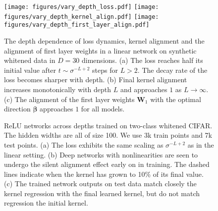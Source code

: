 \documentclass{article} %
\begin{document}
\begin{appendix}

\begin{figure}[ht]
    \centering
    \texttt{[image: figures/vary\_depth\_loss.pdf]}
    \texttt{[image: figures/vary\_depth\_kernel\_align.pdf]}
    \texttt{[image: figures/vary\_depth\_first\_layer\_align.pdf]}
    \caption{The depth dependence of loss dynamics, kernel alignment and the alignment of first layer weights in a linear network on synthetic whitened data in $D=30$ dimensions. (a) The loss reaches half its initial value after $t \sim \sigma^{-L + 2}$ steps for $L>2$. The decay rate of the loss becomes sharper with depth. (b) Final kernel alignment increases monotonically with depth $L$ and approaches $1$ as $L \to \infty$. (c) The alignment of the first layer weights $\bm W_1$ with the optimal direction $\bm\beta$ approaches $1$ for all models.  }
    \label{fig:my_label}
\end{figure}


\begin{figure}[ht]
    \centering
    \caption{ReLU networks across depths trained on two-class whitened CIFAR. The hidden widths are all of size 100. We use 3k train points and 7k test points. (a) The loss exhibits the same scaling as $\sigma^{-L+2}$ as in the linear setting. (b) Deep networks with nonlinearities are seen to undergo the silent alignment effect early on in training. The dashed lines indicate when the kernel has grown to 10\% of its final value. (c) The trained network outputs on test data match closely the kernel regression with the final learned kernel, but do not match regression the initial kernel.}
    \label{fig:two_layer_relu_mnist}
\end{figure}






\end{appendix}
\end{document}
